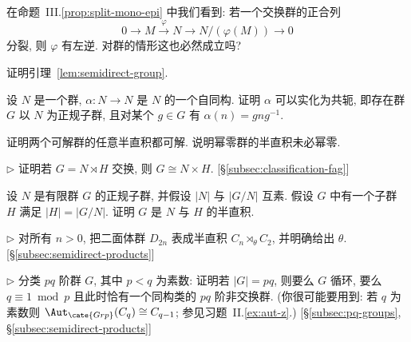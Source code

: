 \begin{prob}
\label{ex:split-left-inverse}
在命题~III.\ref{prop:split-mono-epi} 中我们看到: 若一个交换群的正合列
\[
0 \longrightarrow M \stackrel{\varphi}{\longrightarrow} N \longrightarrow N/(\varphi(M)) \longrightarrow 0
\]
分裂, 则 $\varphi$ 有左逆. 对群的情形这也必然成立吗?
\end{prob}

\begin{prob}
\label{ex:semidirect-group-proof}
证明引理~\ref{lem:semidirect-group}.
\end{prob}

\begin{prob}
\label{ex:realize-automorphism}
设 $N$ 是一个群, $\alpha : N \to N$ 是 $N$ 的一个自同构. 证明 $\alpha$ 可以实化为共轭, 即存在群 $G$ 以 $N$ 为正规子群, 且对某个 $g \in G$ 有 $\alpha(n) = g n g^{-1}$.
\end{prob}

\begin{prob}
\label{ex:semidirect-solvable}
证明两个可解群的任意半直积都可解. 说明幂零群的半直积未必幂零.
\end{prob}

\begin{prob}
\label{ex:commutative-semidirect-direct}
$\triangleright$ 证明若 $G = N \rtimes H$ 交换, 则 $G \cong N \times H$. [\S\ref{subsec:classification-fag}]
\end{prob}

\begin{prob}
\label{ex:coprime-semidirect}
设 $N$ 是有限群 $G$ 的正规子群, 并假设 $|N|$ 与 $|G/N|$ 互素. 假设 $G$ 中有一个子群 $H$ 满足 $|H| = |G/N|$. 证明 $G$ 是 $N$ 与 $H$ 的半直积.
\end{prob}

\begin{prob}
\label{ex:dihedral-semidirect}
$\triangleright$ 对所有 $n > 0$, 把二面体群 $D_{2n}$ 表成半直积 $C_n \rtimes_{\theta} C_2$, 并明确给出 $\theta$. [\S\ref{subsec:semidirect-products}]
\end{prob}

\begin{prob}
\label{ex:pq-noncomm}
$\triangleright$ 分类 $pq$ 阶群 $G$, 其中 $p < q$ 为素数: 证明若 $|G| = pq$, 则要么 $G$ 循环, 要么 $q \equiv 1 \bmod p$ 且此时恰有一个同构类的 $pq$ 阶非交换群. (你很可能要用到: 若 $q$ 为素数则 $\Aut_{\cate{Grp}}(C_q) \cong C_{q-1}$; 参见习题~II.\ref{ex:aut-z}.) [\S\ref{subsec:pq-groups}, \S\ref{subsec:semidirect-products}]
\end{prob}


